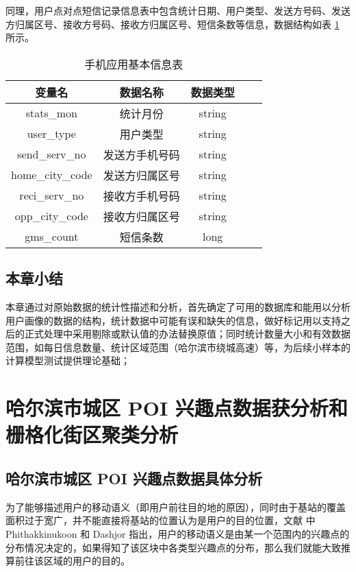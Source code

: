 同理，用户点对点短信记录信息表中包含统计日期、用户类型、发送方号码、发送方归属区号、接收方号码、接收方归属区号、短信条数等信息，数据结构如表 \ref{tab:msg_data} 所示。

\begin{table}[htbp]
    \caption{手机应用基本信息表}
    \vspace{0.5em}\centering\wuhao
    \begin{tabular}{ccccc}
        \toprule[1.5pt]
        变量名 & 数据名称 & 数据类型 \\
        \midrule[1pt]
        stats\_mon & 统计月份 & string \\
        user\_type & 用户类型 & string \\
        send\_serv\_no & 发送方手机号码 & string \\
        home\_city\_code & 发送方归属区号 & string \\
        reci\_serv\_no & 接收方手机号码 & string \\
        opp\_city\_code & 接收方归属区号 & string \\
        gms\_count & 短信条数 & long \\
        \bottomrule[1.5pt]
    \end{tabular}
    \label{tab:msg_data}
\end{table}

\section{本章小结}

本章通过对原始数据的统计性描述和分析，首先确定了可用的数据库和能用以分析用户画像的数据的结构，统计数据中可能有误和缺失的信息，做好标记用以支持之后的正式处理中采用剔除或默认值的办法替换原值；同时统计数量大小和有效数据范围，如每日信息数量、统计区域范围（哈尔滨市绕城高速）等，为后续小样本的计算模型测试提供理论基础；

\chapter{哈尔滨市城区 POI 兴趣点数据获分析和栅格化街区聚类分析}

\section{哈尔滨市城区 POI 兴趣点数据具体分析}

为了能够描述用户的移动语义（即用户前往目的地的原因），同时由于基站的覆盖面积过于宽广，并不能直接将基站的位置认为是用户的目的位置，文献 \cite{phithakkitnukoon_activity-aware_2010}\cite{dashdorj_semantic_2018} 中 Phithakkinukoon 和 Dashjor 指出，用户的移动语义是由某一个范围内的兴趣点的分布情况决定的，如果得知了该区块中各类型兴趣点的分布，那么我们就能大致推算前往该区域的用户的目的。

